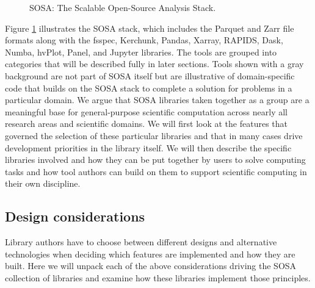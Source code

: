 \begin{figure}[t]
    \noindent{}
    \caption{SOSA: The Scalable Open-Source Analysis Stack\label{sosa}.}
\end{figure}
Figure \ref{sosa} illustrates the SOSA stack, which includes the Parquet and Zarr file formats along with the fsspec, Kerchunk, Pandas, Xarray, RAPIDS, Dask, Numba, hvPlot, Panel, and Jupyter libraries. The tools are grouped into categories that will be described fully in later sections. Tools shown with a gray background are not part of SOSA itself but are illustrative of domain-specific code that builds on the SOSA stack to complete a solution for problems in a particular domain. We argue that SOSA libraries taken together as a group are a meaningful base for general-purpose scientific computation across nearly all research areas and scientific domains. We will first look at the features that governed the selection of these particular libraries and that in many cases drive development priorities in the library itself. We will then describe the specific libraries involved and how they can be put together by users to solve computing tasks and how tool authors can build on them to support scientific computing in their own discipline.

\subsection{Design considerations}

Library authors have to choose between different designs and alternative technologies when deciding which features are implemented and how they are built.  Here we will unpack each of the above considerations driving the SOSA collection of libraries and examine how these libraries implement those principles.

